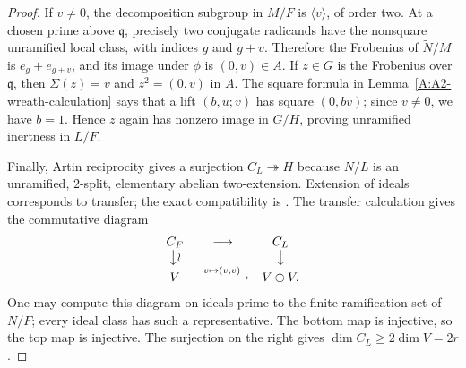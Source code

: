 \begin{proof}
If $v\ne0$, the decomposition subgroup in $M/F$ is
$\langle v\rangle$, of order two. At a chosen prime above
$\mathfrak q$, precisely two conjugate radicands have the
nonsquare unramified local class, with indices $g$ and $g+v$.
Therefore the Frobenius of $\widetilde N/M$ is $e_g+e_{g+v}$,
and its image under $\phi$ is $(0,v)\in A$.
If $z\in G$ is the Frobenius over $\mathfrak q$, then
$\Sigma(z)=v$ and $z^2=(0,v)$ in $A$. The square formula in
Lemma~\ref{A:A2-wreath-calculation} says that a lift $(b,u;v)$
has square $(0,bv)$; since $v\ne0$, we have $b=1$.
Hence $z$ again has nonzero image in $G/H$, proving unramified
inertness in $L/F$.

Finally, Artin reciprocity gives a surjection
$C_L\twoheadrightarrow H$ because $N/L$ is an unramified,
$2$-split, elementary abelian two-extension. Extension of ideals
corresponds to transfer; the exact compatibility is
\cite[Chapter V, Proposition 3.18 and the paragraph following it,
p.~162]{C_MilneCFT2020}. The transfer calculation gives the
commutative diagram
\[
 \begin{array}{ccc}
 C_F&\longrightarrow&C_L\\
 \big\downarrow\wr&&\big\downarrow\\
 V&\xrightarrow{\ v\mapsto(v,v)\ }&V\oplus V.
 \end{array}
\]
One may compute this diagram on ideals prime to the finite
ramification set of $N/F$; every ideal class has such a representative.
The bottom map is injective, so the top map is injective. The
surjection on the right gives $\dim C_L\ge2\dim V=2r$.
\end{proof}

